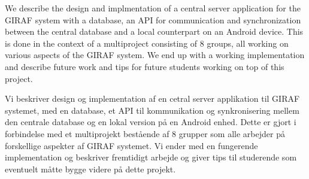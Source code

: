 We describe the design and implmentation of a central server application for the GIRAF system with a database, an API for communication and synchronization between the central database and a local counterpart on an Android device. This is done in the context of a multiproject consisting of 8 groups, all working on various aspects of the GIRAF system. We end up with a working implementation and describe future work and tips for future students working on top of this project.

\vspace{10px}

Vi beskriver design og implementation af en cetral server applikation til GIRAF systemet, med en database, et API til kommunikation og synkronisering mellem den centrale database og en lokal version på en Android enhed. Dette er gjort i forbindelse med et multiprojekt bestående af 8 grupper som alle arbejder på forskellige aspekter af GIRAF systemet. Vi ender med en fungerende implementation og beskriver fremtidigt arbejde og giver tips til studerende som eventuelt måtte bygge videre på dette projekt.